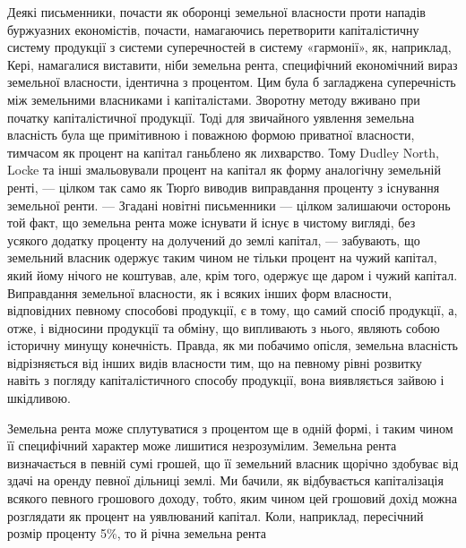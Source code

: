 Деякі письменники, почасти як оборонці земельної власности проти нападів
буржуазних економістів, почасти, намагаючись перетворити капіталістичну систему продукції з системи
суперечностей в систему «гармонії», як, наприклад,
Кері, намагалися виставити, ніби земельна рента, специфічний економічний
вираз земельної власности, ідентична з процентом. Цим була б загладжена суперечність між земельними
власниками і капіталістами. Зворотну методу вживано при початку капіталістичної продукції. Тоді для
звичайного уявлення земельна власність була ще примітивною і поважною формою приватної власности,
тимчасом
як процент на капітал ганьблено як лихварство. Тому Dudley North, Locke
та інші змальовували процент на капітал як форму аналогічну земельній
ренті, — цілком так само як Тюрґо виводив виправдання проценту з існування
земельної ренти. — Згадані новітні письменники — цілком залишаючи осторонь той факт, що земельна
рента може існувати й існує в чистому вигляді,
без усякого додатку проценту на долучений до землі капітал, — забувають, що
земельний власник одержує таким чином не тільки процент на чужий капітал,
який йому нічого не коштував, але, крім того, одержує ще даром і чужий
капітал. Виправдання земельної власности, як і всяких інших форм власности,
відповідних певному способові продукції, є в тому, що самий спосіб продукції,
а, отже, і відносини продукції та обміну, що випливають з нього, являють собою
історичну минущу конечність. Правда, як ми побачимо опісля, земельна власність
відрізняється від інших видів власности тим, що на певному рівні розвитку
навіть з погляду капіталістичного способу продукції, вона виявляється зайвою
і шкідливою.

Земельна рента може сплутуватися з процентом ще в одній формі, і таким чином її специфічний характер
може лишитися незрозумілим. Земельна
рента визначається в певній сумі грошей, що її земельний власник щорічно здобуває від здачі на
оренду певної дільниці землі. Ми бачили, як відбувається
капіталізація всякого певного грошового доходу, тобто, яким чином
цей грошовий дохід можна розглядати як процент на уявлюваний капітал.
Коли, наприклад, пересічний розмір проценту 5\%, то й річна земельна рента
\parbreak{}  %
